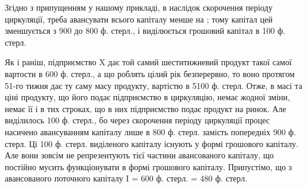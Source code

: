 Згідно з припущенням у нашому прикладі, в наслідок скорочення періоду
циркуляції, треба авансувати всього капіталу менше на ; тому
капітал цей зменшується з 900 до 800 ф. стерл., і виділюється грошовий
капітал в 100 ф. стерл.

Як і раніш, підприємство X дає той самий шеститижневий продукт такої
самої вартости в 600 ф. стерл., а що роблять цілий рік безперервно, то
воно протягом 51-го тижня дає ту саму масу продукту, вартістю в 5100 ф.
стерл. Отже, в масі та ціні продукту, що його подає підприємство в
циркуляцію, немає жодної зміни, немає її і в тих строках, що в них підприємство
подає продукт на ринок. Але виділилось 100 ф. стерл., бо
через скорочення періоду циркуляції процес насичено авансуванням капіталу
лише в 800 ф. стерл. замість попередніх 900 ф. стерл. Ці 100 ф.
стерл. виділеного капіталу існують у формі грошового капіталу. Але вони
зовсім не репрезентують тієї частини авансованого капіталу, що постійно
мусить функціонувати в формі грошового капіталу. Припустімо, що з
авансованого поточного капіталу I = 600 ф. стерл.  = 480 ф. стерл.
\parbreak{}  %
